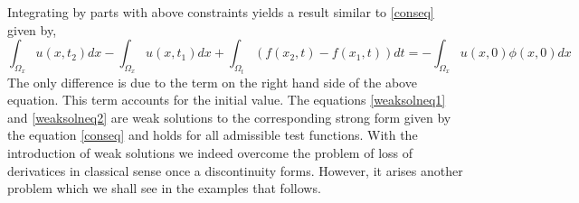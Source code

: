 \documentclass[11pt, a4paper]{report}
\begin{document}
Integrating by parts with above constraints yields a result similar to \eqref{conseq} given by,
\begin{equation} \label{weaksolneq2}
    \int_{\Omega_{x}}u\left(x, t_{2}\right)dx - \int_{\Omega_{x}} u\left(x, t_{1}\right)dx + \int_{\Omega_{t}} (f\left(x_{2}, t\right) - f\left(x_{1}, t\right))dt = -\int_{\Omega_{x}}u(x, 0)\phi(x, 0)dx
\end{equation}
The only difference is due to the term on the right hand side of the above equation. This term accounts for the 
initial value. The equations \eqref{weaksolneq1} and \eqref{weaksolneq2} are weak solutions to the corresponding 
strong form given by the equation \eqref{conseq} and holds for all admissible test functions. With the introduction
of weak solutions we indeed overcome the problem of loss of derivatices in classical sense once a discontinuity 
forms. However, it arises another problem which we shall see in the examples that follows.
\end{document}
